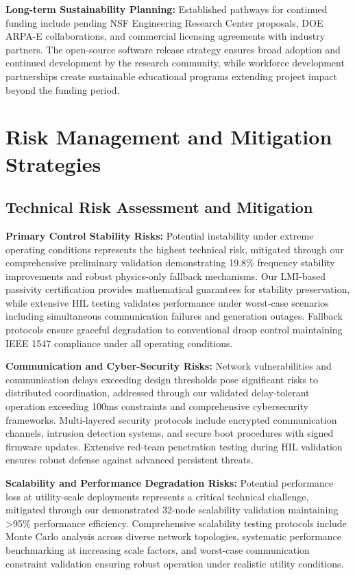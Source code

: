 \documentclass[12pt]{article}
\begin{document}
\textbf{Long-term Sustainability Planning:} Established pathways for continued funding include pending NSF Engineering Research Center proposals, DOE ARPA-E collaborations, and commercial licensing agreements with industry partners. The open-source software release strategy ensures broad adoption and continued development by the research community, while workforce development partnerships create sustainable educational programs extending project impact beyond the funding period.

\section{Risk Management and Mitigation Strategies}

\subsection{Technical Risk Assessment and Mitigation}

\textbf{Primary Control Stability Risks:} Potential instability under extreme operating conditions represents the highest technical risk, mitigated through our comprehensive preliminary validation demonstrating 19.8\% frequency stability improvements and robust physics-only fallback mechanisms. Our LMI-based passivity certification provides mathematical guarantees for stability preservation, while extensive HIL testing validates performance under worst-case scenarios including simultaneous communication failures and generation outages. Fallback protocols ensure graceful degradation to conventional droop control maintaining IEEE 1547 compliance under all operating conditions.

\textbf{Communication and Cyber-Security Risks:} Network vulnerabilities and communication delays exceeding design thresholds pose significant risks to distributed coordination, addressed through our validated delay-tolerant operation exceeding 100ms constraints and comprehensive cybersecurity frameworks. Multi-layered security protocols include encrypted communication channels, intrusion detection systems, and secure boot procedures with signed firmware updates. Extensive red-team penetration testing during HIL validation ensures robust defense against advanced persistent threats.

\textbf{Scalability and Performance Degradation Risks:} Potential performance loss at utility-scale deployments represents a critical technical challenge, mitigated through our demonstrated 32-node scalability validation maintaining >95\% performance efficiency. Comprehensive scalability testing protocols include Monte Carlo analysis across diverse network topologies, systematic performance benchmarking at increasing scale factors, and worst-case communication constraint validation ensuring robust operation under realistic utility conditions.
\end{document}
